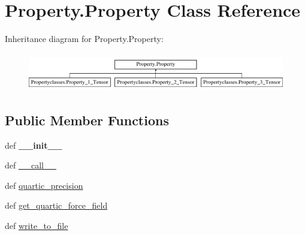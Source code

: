 \hypertarget{classProperty_1_1Property}{\section{Property.\+Property Class Reference}
\label{classProperty_1_1Property}
}
Inheritance diagram for Property.\+Property\+:\begin{figure}[H]
\begin{center}
\leavevmode
\includegraphics[height=1.666667cm]{classProperty_1_1Property}
\end{center}
\end{figure}
\subsection*{Public Member Functions}
\begin{DoxyCompactItemize}
\item 
\hypertarget{classProperty_1_1Property_a9a022528df4e8d4c6a7664826af48a54}{def {\bfseries \+\_\+\+\_\+init\+\_\+\+\_\+}}\label{classProperty_1_1Property_a9a022528df4e8d4c6a7664826af48a54}

\item 
def \hyperlink{classProperty_1_1Property_a45a72dc8487d8537c6d14cfed5663139}{\+\_\+\+\_\+call\+\_\+\+\_\+}
\item 
def \hyperlink{classProperty_1_1Property_ae98895c0fc4edb65ecc6f262a1d870da}{quartic\+\_\+precision}
\item 
def \hyperlink{classProperty_1_1Property_acbce93000fa76899a14184a1177f0560}{get\+\_\+quartic\+\_\+force\+\_\+field}
\item 
def \hyperlink{classProperty_1_1Property_a70bfec9e630a20db49fe05ef2ca58682}{write\+\_\+to\+\_\+file}
\end{DoxyCompactItemize}
